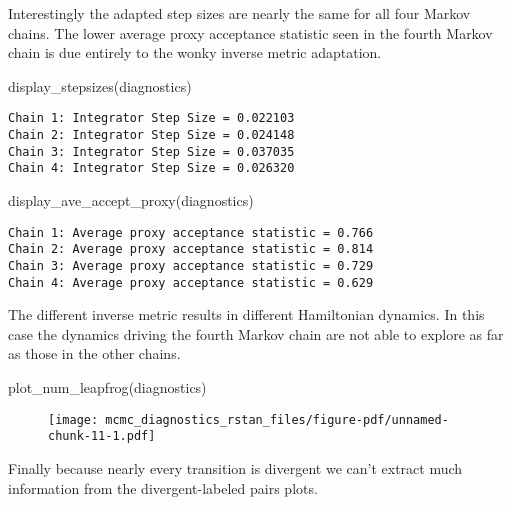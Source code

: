 \documentclass[
  letterpaper,
  DIV=11,
  numbers=noendperiod]{scrartcl}
\newenvironment{Shaded}{\begin{snugshade}}{\end{snugshade}}
\newcommand{\FunctionTok}[1]{\textcolor[rgb]{0.28,0.35,0.67}{#1}}
\newcommand{\NormalTok}[1]{\textcolor[rgb]{0.00,0.23,0.31}{#1}}
\begin{document}
Interestingly the adapted step sizes are nearly the same for all four
Markov chains. The lower average proxy acceptance statistic seen in the
fourth Markov chain is due entirely to the wonky inverse metric
adaptation.

\begin{Shaded}
\begin{Highlighting}[]
\FunctionTok{display\_stepsizes}\NormalTok{(diagnostics)}
\end{Highlighting}
\end{Shaded}

\begin{verbatim}
Chain 1: Integrator Step Size = 0.022103
Chain 2: Integrator Step Size = 0.024148
Chain 3: Integrator Step Size = 0.037035
Chain 4: Integrator Step Size = 0.026320
\end{verbatim}

\begin{Shaded}
\begin{Highlighting}[]
\FunctionTok{display\_ave\_accept\_proxy}\NormalTok{(diagnostics)}
\end{Highlighting}
\end{Shaded}

\begin{verbatim}
Chain 1: Average proxy acceptance statistic = 0.766
Chain 2: Average proxy acceptance statistic = 0.814
Chain 3: Average proxy acceptance statistic = 0.729
Chain 4: Average proxy acceptance statistic = 0.629
\end{verbatim}

The different inverse metric results in different Hamiltonian dynamics.
In this case the dynamics driving the fourth Markov chain are not able
to explore as far as those in the other chains.

\begin{Shaded}
\begin{Highlighting}[]
\FunctionTok{plot\_num\_leapfrog}\NormalTok{(diagnostics)}
\end{Highlighting}
\end{Shaded}

\begin{figure}[H]

{\centering \texttt{[image: mcmc\_diagnostics\_rstan\_files/figure-pdf/unnamed-chunk-11-1.pdf]}

}

\end{figure}

Finally because nearly every transition is divergent we can't extract
much information from the divergent-labeled pairs plots.
\end{document}
